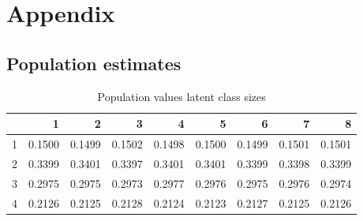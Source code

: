 \documentclass[a4paper, 11pt]{article} %
\begin{document}
\clearpage


\newpage
\appendix
\section{Appendix}
\subsection{Population estimates} \label{Pop}
\begin{table}[ht]
\centering
\footnotesize
\caption{Population values latent class sizes}
\begin{tabular}{rrrrrrrrr}
  \hline
 & 1 & 2 & 3 & 4 & 5 & 6 & 7 & 8 \\ 
  \hline
1 & 0.1500 & 0.1499 & 0.1502 & 0.1498 & 0.1500 & 0.1499 & 0.1501 & 0.1501 \\ 
  2 & 0.3399 & 0.3401 & 0.3397 & 0.3401 & 0.3401 & 0.3399 & 0.3398 & 0.3399 \\ 
  3 & 0.2975 & 0.2975 & 0.2973 & 0.2977 & 0.2976 & 0.2975 & 0.2976 & 0.2974 \\ 
  4 & 0.2126 & 0.2125 & 0.2128 & 0.2124 & 0.2123 & 0.2127 & 0.2125 & 0.2126 \\ 
   \hline
\end{tabular}
\end{table}
\end{document}
